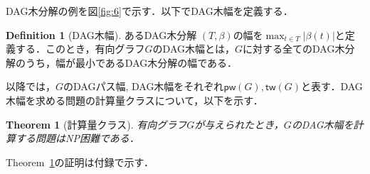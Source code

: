 \documentclass[master]{kuisthesis}		%
\theoremstyle{plain}
\newtheorem{theorem}{Theorem}
\theoremstyle{definition}
\newtheorem{definition*}{Definition}
\begin{document}
DAG木分解の例を図\ref{fig:6}で示す．以下でDAG木幅を定義する．

\begin{definition*}[DAG木幅]
    あるDAG木分解 $(T, \beta)$の幅を$\max_{t \in T}|\beta(t)|$と定義する．このとき，有向グラフ$G$のDAG木幅とは，$G$に対する全てのDAG木分解のうち，幅が最小であるDAG木分解の幅である．
\end{definition*}

以降では，$G$のDAGパス幅, DAG木幅をそれぞれ$\mathsf{pw}(G), \mathsf{tw}(G)$と表す．DAG木幅を求める問題の計算量クラスについて，以下を示す．

\begin{theorem}[計算量クラス]\label{NP困難}
    有向グラフ$G$が与えられたとき，$G$のDAG木幅を計算する問題はNP困難である．
\end{theorem}

Theorem~\ref{NP困難}の証明は付録で示す．
\end{document}
